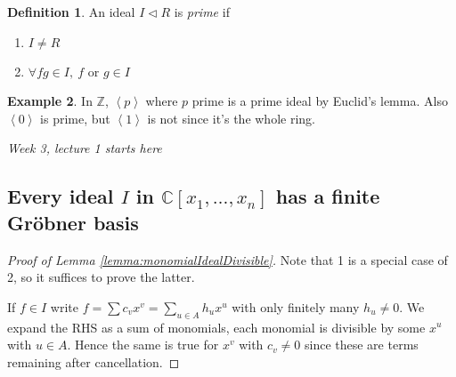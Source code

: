 \documentclass[a4paper]{article}
\newcommand{\la}{\left\langle}
\newcommand{\ra}{\right\rangle}
\newcommand{\Z}{\mathbb Z}
\newcommand{\C}{\mathbb C}
\theoremstyle{definition}
\newtheorem{defn}{Definition}[subsection]
\newtheorem{example}[defn]{Example}
\begin{document}
\begin{defn}
An ideal $I\lhd R$ is \textit{prime} if
\begin{enumerate}
\item $I\neq R$
\item $\forall fg\in I,\ f$ or $g\in I$
\end{enumerate}
\end{defn}
\begin{example}
In $\Z$, $\la p\ra$ where $p$ prime is a prime ideal by Euclid's lemma. Also $\la 0\ra$ is prime, but $\la 1\ra$ is not since it's the whole ring.
\end{example}

\begin{flushright}
\textit{Week 3, lecture 1 starts here}
\end{flushright}

\subsection{Every ideal $I$ in $\C[x_1,\ldots,x_n]$ has a finite Gröbner basis}

\begin{proof}[Proof of Lemma \ref{lemma:monomialIdealDivisible}]
Note that 1 is a special case of 2, so it suffices to prove the latter.

If $f\in I$ write $f=\sum c_v x^v = \sum_{u\in A} h_u x^u$ with only finitely many $h_u\neq 0$. We expand the RHS as a sum of monomials, each monomial is divisible by some $x^u$ with $u\in A$. Hence the same is true for $x^v$ with $c_v\neq 0$ since these are terms remaining after cancellation.
\end{proof}
\end{document}

